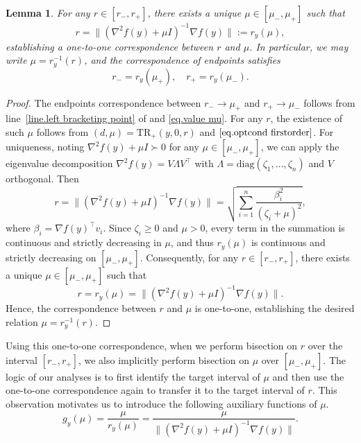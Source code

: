 \documentclass{article}
\newtheorem{lemma}[theorem]{Lemma}
\numberwithin{equation}{section}
\newcommand{\trp}{\textrm{TR}_+}
\numberwithin{equation}{section}
\begin{document}
\begin{lemma}
    \label{lem.one-to-one correspondence}
    For any $r \in [r_-, r_+]$, there exists a unique $\mu \in [\mu_-, \mu_+]$ such that
    \[
        r = \|(\nabla^2 f(y) + \mu I)^{-1} \nabla f(y)\| := r_y(\mu),
    \]
    establishing a one-to-one correspondence between $r$ and $\mu$.
    In particular, we may write $\mu = r_y^{-1}(r)$,
    and the correspondence of endpoints satisfies
    \[
        r_- = r_y(\mu_+),
        \quad
        r_+ = r_y(\mu_-).
    \]
\end{lemma}
\begin{proof}
    The endpoints correspondence between $r_- \to \mu_+$ and $r_+ \to \mu_-$ follows from line~\ref{line.left bracketing point} of  and \eqref{eq.value mu}.
    For any $r$, the existence of such $\mu$ follows from $(d,\mu)=\trp(y,0,r)$ and $\eqref{eq.optcond firstorder}$. For uniqueness, noting $\nabla^2 f(y) + \mu I \succ 0$ for any $\mu \in [\mu_-, \mu_+]$,
    we can apply the eigenvalue decomposition
    $\nabla^2 f(y) = V \Lambda V^\top$ with $\Lambda = \mathrm{diag}(\zeta_1,\dots,\zeta_n)$ and $V$ orthogonal.
    Then
    \[
        r = \bigl\|(\nabla^2 f(y) + \mu I)^{-1}\nabla f(y)\bigr\|
        = \sqrt{\sum_{i=1}^n \frac{\beta_i^2}{(\zeta_i + \mu)^2}},
    \]
    where $\beta_i = \nabla f(y)^\top v_i$. Since $\zeta_i \ge 0$ and $\mu > 0$, every term in the summation is continuous and strictly decreasing in $\mu$, and thus $r_y(\mu)$ is continuous and strictly decreasing on $[\mu_-, \mu_+]$.
    Consequently, for any $r \in [r_-, r_+]$, there exists a unique $\mu \in [\mu_-, \mu_+]$ such that
    \[
        r = r_y(\mu) = \bigl\|(\nabla^2 f(y) + \mu I)^{-1}\nabla f(y)\bigr\|.
    \]
    Hence, the correspondence between $r$ and $\mu$ is one-to-one, establishing the desired relation $\mu = r_y^{-1}(r)$.
\end{proof}
Using this one-to-one correspondence, when we perform bisection on $r$ over the interval $[r_-,r_+]$, we also implicitly perform bisection on $\mu$ over $[\mu_-,\mu_+]$. The logic of our analyses is to first identify the target interval of $\mu$ and then use the one-to-one correspondence again to transfer it to the target interval of $r$. This observation motivates us to introduce the following auxiliary functions of $\mu$.
\begin{equation}
    \label{eq.auxiliary function for bisection}
    g_y(\mu) =\frac{\mu}{r_y(\mu)}=\frac{\mu}{\| (\nabla^2 f(y)+\mu I)^{-1}\nabla f(y)\|}.
\end{equation}
\end{document}
